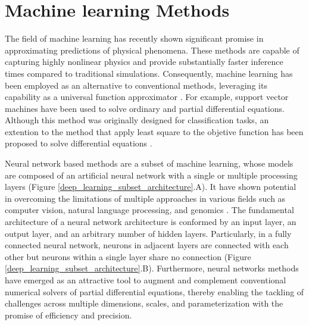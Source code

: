 \documentclass[11pt,twoside]{article}
\begin{document}
\section{Machine learning Methods}\label{sec:machine_learning_methods}

The field of machine learning has recently shown significant promise in approximating predictions of physical 
phenomena. These methods are capable of capturing highly nonlinear physics and provide substantially faster inference 
times compared to traditional simulations. Consequently, machine learning has been employed as an alternative to 
conventional methods, leveraging its capability as a universal function approximator \citep{hornik_approximation_1991}.
For example, support vector machines have been used to solve ordinary and partial differential equations. Although 
this method was originally designed for classification tasks, an extention to the method that apply least square to 
the objetive function has been proposed to solve differential equations \citep{mehrkanoon_approximate_2012,
mehrkanoon_learning_2015}.

Neural network based methods are a subset of machine learning, whose models are composed of an artificial neural 
network with a single or multiple processing layers (Figure \ref{deep_learning_subset_architecture}.A). It have 
shown potential in overcoming the limitations of multiple approaches in various fields such as computer vision, 
natural language processing, and genomics \citep{lecun_deep_2015,goodfellow_deep_2016}. The fundamental architecture 
of a neural network architecture is conformed by an input layer, an output layer, and an arbitrary number of hidden 
layers. Particularly, in a fully connected neural network, neurons in adjacent layers are connected with each other 
but neurons within a single layer share no connection (Figure \ref{deep_learning_subset_architecture}.B). Furthermore, 
neural networks methods have emerged as an attractive tool to augment and complement conventional numerical solvers 
of partial differential equations, thereby enabling the tackling of challenges across multiple dimensions, scales, 
and parameterization with the promise of efficiency and precision. 
\end{document}
